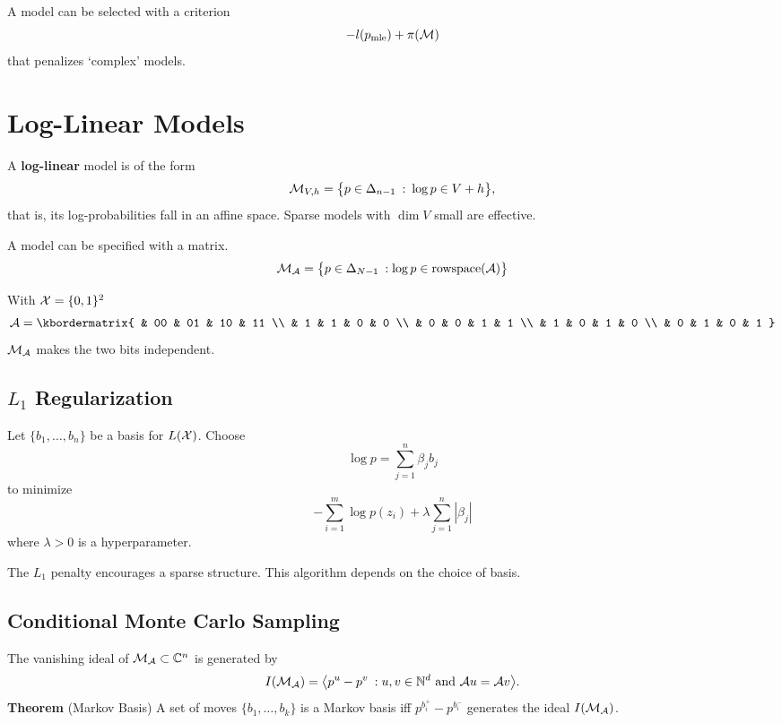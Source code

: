 \documentclass[thesis]{hmcposter}
\newcommand{\mterm}[1]{\textbf{\textcolor{cterm}{#1}}}
\newcommand*{\STB}{\::\:}
\newcommand*{\mle}{\mathrm{mle}}
\newcommand*{\halfspace}{\vspace{0.5\baselineskip}}
\newcommand*{\nhalfspace}{\vspace{-0.5\baselineskip}}
\newcommand*{\nquarterspace}{\vspace{-0.25\baselineskip}}
\begin{document}
\begin{poster}
A model can be selected with a criterion
\[
    -l(p_\mle) + \pi(\ms)
\]
that penalizes `complex' models.

\halfspace
\columnbreak


\section{Log-Linear Models}
\nhalfspace

A \mterm{log-linear} model is of the form
\[
    \ms_{V,h} = \cdel[\big]{p \in \Delta_{n-1} \STB \log p \in V + h},
\]
that is, its log-probabilities fall in an affine space.  Sparse models with
$\dim V$ small are effective.

A model can be specified with a matrix.
\[
    \ms_\as = \cdel[\big]{ p \in \Delta_{N-1}
    \:: \log p  \in \mathrm{rowspace}(\as)}
\]

 With $\xs = \{0, 1\}^2$
\[
        \as = \kbordermatrix{
            & 00 & 01 & 10 & 11 \\
            &  1 & 1  & 0  & 0 \\
            &  0 & 0  & 1  & 1 \\
            &  1 & 0  & 1  & 0 \\
            &  0 & 1  & 0  & 1
        }
\]
$\ms_\as$ makes the two bits independent.


\nhalfspace
\subsection{$L_1$ Regularization}
\nquarterspace

Let $\{b_1, \ldots, b_n\}$ be a basis for $L(\xs)$.  Choose
\[
    \log p = \sum_{j=1}^n \beta_j b_j
\]
to minimize
\[
    -\sum_{i=1}^m \log p(z_i) + \lambda \sum_{j=1}^n |\beta_j|
\]
where $\lambda > 0$ is a hyperparameter.

The $L_1$ penalty encourages a sparse structure.  This algorithm depends on the
choice of basis.

\nhalfspace
\subsection{Conditional Monte Carlo Sampling}
\nquarterspace
The vanishing ideal of $\ms_\as \subset \C^n$ is generated by
\[
    I(\ms_\as) = \adel[\big]{
        p^u - p^v \::
        \text{$u, v \in \mathbb N^d$ and $\as u = \as v$}
    }.
\]
{\bf Theorem} (Markov Basis)
A set of moves $\{b_1, \ldots, b_k\}$ is a Markov basis iff $p^{b_i^+} -
p^{b_i^-}$ generates the ideal $I(\ms_\as)$.


\end{poster}
\end{document}
